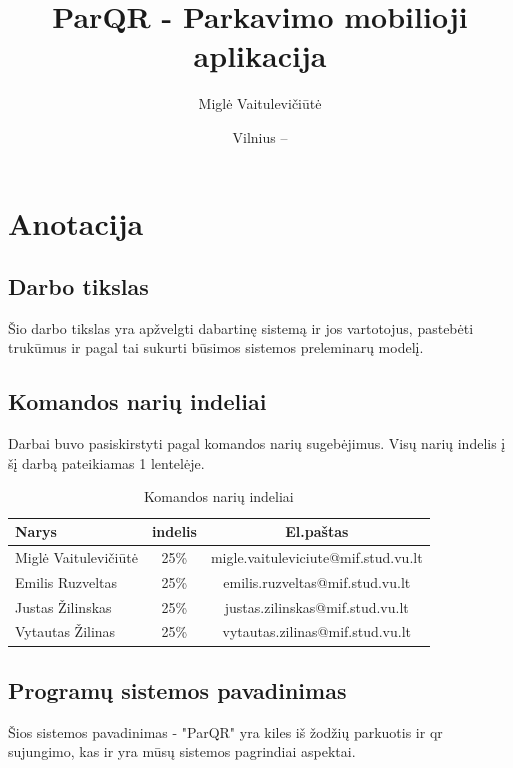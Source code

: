 \documentclass{VUMIFPSkursinis}
\title{ParQR - Parkavimo mobilioji aplikacija}
\author{Miglė Vaitulevičiūtė}
\date{Vilnius – \the\year}
\begin{document}
\maketitle

\tableofcontents

\section*{Anotacija}

\subsection*{Darbo tikslas}

Šio darbo tikslas yra apžvelgti dabartinę sistemą ir jos vartotojus, pastebėti trukūmus ir pagal tai sukurti būsimos sistemos preleminarų modelį.

\subsection*{Komandos narių indeliai}

Darbai buvo pasiskirstyti pagal komandos narių sugebėjimus. Visų narių indelis į šį darbą pateikiamas 1 lentelėje.

\begin{table}[H]\footnotesize
  \centering
  \caption{Komandos narių indeliai}
  {\begin{tabular}{|l|c|c|} \hline
    Narys & indelis & El.paštas \\
    \hline
    Miglė Vaitulevičiūtė& 25\% & migle.vaituleviciute@mif.stud.vu.lt       		\\
    Emilis Ruzveltas 	& 25\% & emilis.ruzveltas@mif.stud.vu.lt       			\\
    Justas Žilinskas 	& 25\% & justas.zilinskas@mif.stud.vu.lt       			\\
    Vytautas Žilinas 	& 25\% & vytautas.zilinas@mif.stud.vu.lt       			\\
    \hline
  \end{tabular}}
  \label{tab:komanda}
\end{table}


\subsection*{Programų sistemos pavadinimas}

Šios sistemos pavadinimas - "ParQR" yra kiles iš žodžių parkuotis ir qr sujungimo, kas ir yra mūsų sistemos pagrindiai aspektai.
\end{document}
